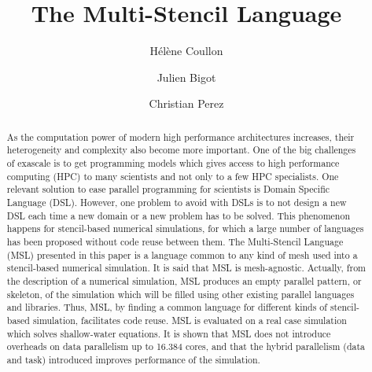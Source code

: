 \documentclass[smallextended]{svjour3}       %
\begin{document}
\title{The Multi-Stencil Language}


\author{H\'el\`ene Coullon \and Julien Bigot \and Christian Perez}





\maketitle

\begin{abstract}
As the computation power of modern high performance architectures increases, their heterogeneity and complexity also become more important. One of the big challenges of exascale is to get programming models which gives access to high performance computing (HPC) to many scientists and not only to a few HPC specialists. One relevant solution to ease parallel programming for scientists is Domain Specific Language (DSL). However, one problem to avoid with DSLs is to not design a new DSL each time a new domain or a new problem has to be solved. This phenomenon happens for stencil-based numerical simulations, for which a large number of languages has been proposed without code reuse between them. The Multi-Stencil Language (MSL) presented in this paper is a language common to any kind of mesh used into a stencil-based numerical simulation. It is said that MSL is mesh-agnostic. Actually, from the description of a numerical simulation, MSL produces an empty parallel pattern, or skeleton, of the simulation which will be filled using other existing parallel languages and libraries. Thus, MSL, by finding a common language for different kinds of stencil-based simulation, facilitates code reuse. MSL is evaluated on a real case simulation which solves shallow-water equations. It is shown that MSL does not introduce overheads on data parallelism up to 16.384 cores, and that the hybrid parallelism (data and task) introduced improves performance of the simulation.

\end{abstract}
\end{document}
